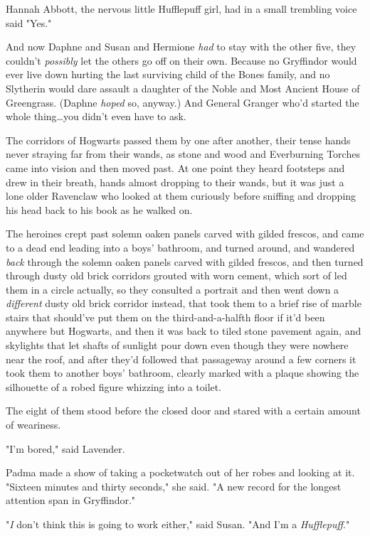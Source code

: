 Hannah Abbott, the nervous little Hufflepuff girl, had in a small trembling
voice said "Yes."

And now Daphne and Susan and Hermione \emph{had} to stay with the other five,
they couldn't \emph{possibly} let the others go off on their own. Because no
Gryffindor would ever live down hurting the last surviving child of the Bones
family, and no Slytherin would dare assault a daughter of the Noble and Most
Ancient House of Greengrass. (Daphne \emph{hoped} so, anyway.) And General
Granger who'd started the whole thing…you didn't even have to ask.

The corridors of Hogwarts passed them by one after another, their tense hands
never straying far from their wands, as stone and wood and Everburning Torches
came into vision and then moved past. At one point they heard footsteps and
drew in their breath, hands almost dropping to their wands, but it was just a
lone older Ravenclaw who looked at them curiously before sniffing and dropping
his head back to his book as he walked on.

The heroines crept past solemn oaken panels carved with gilded frescos, and
came to a dead end leading into a boys' bathroom, and turned around, and
wandered \emph{back} through the solemn oaken panels carved with gilded
frescos, and then turned through dusty old brick corridors grouted with worn
cement, which sort of led them in a circle actually, so they consulted a
portrait and then went down a \emph{different} dusty old brick corridor
instead, that took them to a brief rise of marble stairs that should've put
them on the third-and-a-halfth floor if it'd been anywhere but Hogwarts, and
then it was back to tiled stone pavement again, and skylights that let shafts
of sunlight pour down even though they were nowhere near the roof, and after
they'd followed that passageway around a few corners it took them to another
boys' bathroom, clearly marked with a plaque showing the silhouette of a robed
figure whizzing into a toilet.

The eight of them stood before the closed door and stared with a certain amount
of weariness.

"I'm bored," said Lavender.

Padma made a show of taking a pocketwatch out of her robes and looking at it.
"Sixteen minutes and thirty seconds," she said. "A new record for the longest
attention span in Gryffindor."

"\emph{I} don't think this is going to work either," said Susan. "And I'm a
\emph{Hufflepuff}."

